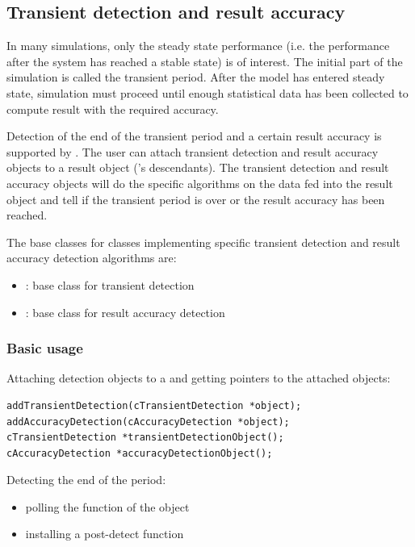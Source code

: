 \subsection{Transient detection and result accuracy}

In many simulations, only the steady state performance (i.e.
the performance after the system has reached a stable state)
is of interest. The initial part of the simulation is called
the transient period. After the model has entered steady state,
simulation must proceed until enough statistical data has been
collected to compute result with the required accuracy.


Detection of the end of the transient period and a certain result
accuracy is supported by {\opp}. The user can attach transient
detection and result accuracy objects to a result object ('s
descendants). The transient detection and result accuracy objects will
do the specific algorithms on the data fed into the result object and
tell if the transient period is over or the result accuracy has been
reached.

The base classes for classes implementing specific transient
detection and result accuracy detection algorithms are:
\begin{itemize}
\item{: base class for transient detection}
\item{: base class for result accuracy detection}
\end{itemize}


\subsubsection{Basic usage}

%
%

Attaching detection objects to a  and getting pointers
to the attached objects:

\begin{verbatim}
addTransientDetection(cTransientDetection *object);
addAccuracyDetection(cAccuracyDetection *object);
cTransientDetection *transientDetectionObject();
cAccuracyDetection *accuracyDetectionObject();
\end{verbatim}


Detecting the end of the period:
\begin{itemize}
\item{polling the  function of the object}
\item{installing a post-detect function}
\end{itemize}


